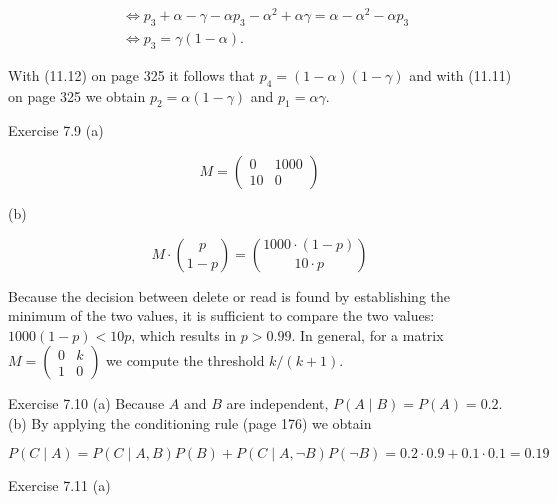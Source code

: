 \documentclass[10pt]{book}
\begin{document}
\begin{align*}
& \Leftrightarrow p_{3}+\alpha-\gamma-\alpha p_{3}-\alpha^{2}+\alpha \gamma=\alpha-\alpha^{2}-\alpha p_{3}  \tag{11.16}\\
& \Leftrightarrow p_{3}=\gamma(1-\alpha) . \tag{11.17}
\end{align*}


With (11.12) on page 325 it follows that $p_{4}=(1-\alpha)(1-\gamma)$ and with (11.11) on page 325 we obtain $p_{2}=\alpha(1-\gamma)$ and $p_{1}=\alpha \gamma$.

Exercise 7.9
(a)

$$
M=\left(\begin{array}{cc}
0 & 1000 \\
10 & 0
\end{array}\right)
$$

(b)

$$
M \cdot\binom{p}{1-p}=\binom{1000 \cdot(1-p)}{10 \cdot p}
$$

Because the decision between delete or read is found by establishing the minimum of the two values, it is sufficient to compare the two values: $1000(1-p)<10 p$, which results in $p>0.99$. In general, for a matrix $M=\left(\begin{array}{ll}0 & k \\ 1 & 0\end{array}\right)$ we compute the threshold $k /(k+1)$.

Exercise 7.10
(a) Because $A$ and $B$ are independent, $P(A \mid B)=P(A)=0.2$.\\
(b) By applying the conditioning rule (page 176) we obtain

$$
P(C \mid A)=P(C \mid A, B) P(B)+P(C \mid A, \neg B) P(\neg B)=0.2 \cdot 0.9+0.1 \cdot 0.1=0.19
$$

Exercise 7.11
(a)
\end{document}
